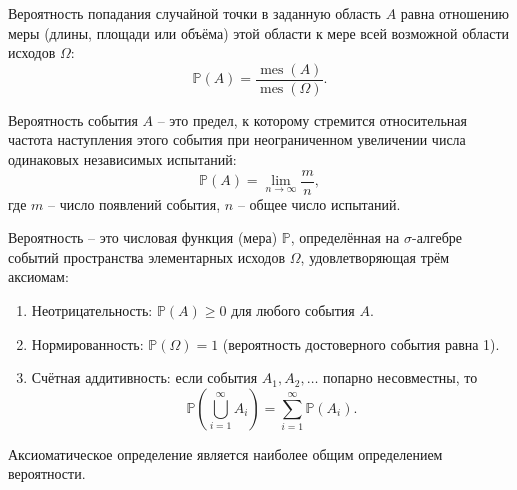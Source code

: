 \begin{definition}
Вероятность попадания случайной точки в заданную область $A$ равна отношению меры (длины, площади или объёма) этой области к мере всей возможной области исходов $\Omega$:
\[
\mathbb{P}(A) = \frac{\operatorname{mes}(A)}{\operatorname{mes}(\Omega)}.
\]
\end{definition}

\begin{definition}
Вероятность события $A$ -- это предел, к которому стремится относительная частота наступления этого события при неограниченном увеличении числа одинаковых независимых испытаний:
\[
\mathbb{P}(A) = \lim_{n \to \infty} \frac{m}{n},
\]
где $m$ -- число появлений события, $n$ -- общее число испытаний.
\end{definition}

\begin{definition}
Вероятность -- это числовая функция (мера) $\mathbb{P}$, определённая на $\sigma$-алгебре событий пространства элементарных исходов $\Omega$, удовлетворяющая трём аксиомам:
\begin{enumerate}
    \item Неотрицательность: $\mathbb{P}(A) \ge 0$ для любого события $A$.
    \item Нормированность: $\mathbb{P}(\Omega) = 1$ (вероятность достоверного события равна 1).
    \item Счётная аддитивность: если события $A_1, A_2, \dots$ попарно несовместны, то
    \[
    \mathbb{P}\!\left(\bigcup_{i=1}^{\infty} A_i\right) = \sum_{i=1}^{\infty} \mathbb{P}(A_i).
    \]
\end{enumerate}
\end{definition}

Аксиоматическое определение является наиболее общим определением вероятности.